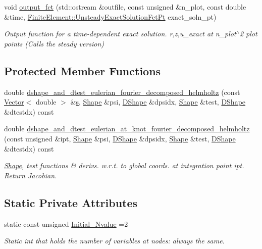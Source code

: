 \begin{DoxyCompactItemize}
void \hyperlink{classoomph_1_1QFourierDecomposedHelmholtzElement_a3552971f652e8b07888071fd8ada95cc}{output\+\_\+fct} (std\+::ostream \&outfile, const unsigned \&n\+\_\+plot, const double \&time, \hyperlink{classoomph_1_1FiniteElement_ad4ecf2b61b158a4b4d351a60d23c633e}{Finite\+Element\+::\+Unsteady\+Exact\+Solution\+Fct\+Pt} exact\+\_\+soln\+\_\+pt)
\begin{DoxyCompactList}\small\item\em Output function for a time-\/dependent exact solution. r,z,u\+\_\+exact at n\+\_\+plot$^\wedge$2 plot points (Calls the steady version) \end{DoxyCompactList}\end{DoxyCompactItemize}
\subsection*{Protected Member Functions}
\begin{DoxyCompactItemize}
\item 
double \hyperlink{classoomph_1_1QFourierDecomposedHelmholtzElement_aa1d0a5bb5a90ffa76df0bb054ffb00db}{dshape\+\_\+and\+\_\+dtest\+\_\+eulerian\+\_\+fourier\+\_\+decomposed\+\_\+helmholtz} (const \hyperlink{classoomph_1_1Vector}{Vector}$<$ double $>$ \&\hyperlink{cfortran_8h_ab7123126e4885ef647dd9c6e3807a21c}{s}, \hyperlink{classoomph_1_1Shape}{Shape} \&psi, \hyperlink{classoomph_1_1DShape}{D\+Shape} \&dpsidx, \hyperlink{classoomph_1_1Shape}{Shape} \&test, \hyperlink{classoomph_1_1DShape}{D\+Shape} \&dtestdx) const
\item 
double \hyperlink{classoomph_1_1QFourierDecomposedHelmholtzElement_a93414259c6dac210e2dc3064bf67c1e4}{dshape\+\_\+and\+\_\+dtest\+\_\+eulerian\+\_\+at\+\_\+knot\+\_\+fourier\+\_\+decomposed\+\_\+helmholtz} (const unsigned \&ipt, \hyperlink{classoomph_1_1Shape}{Shape} \&psi, \hyperlink{classoomph_1_1DShape}{D\+Shape} \&dpsidx, \hyperlink{classoomph_1_1Shape}{Shape} \&test, \hyperlink{classoomph_1_1DShape}{D\+Shape} \&dtestdx) const
\begin{DoxyCompactList}\small\item\em \hyperlink{classoomph_1_1Shape}{Shape}, test functions \& derivs. w.\+r.\+t. to global coords. at integration point ipt. Return Jacobian. \end{DoxyCompactList}\end{DoxyCompactItemize}
\subsection*{Static Private Attributes}
\begin{DoxyCompactItemize}
\item 
static const unsigned \hyperlink{classoomph_1_1QFourierDecomposedHelmholtzElement_a58d9cdd8eb3163b440a8c727f4d071e3}{Initial\+\_\+\+Nvalue} =2
\begin{DoxyCompactList}\small\item\em Static int that holds the number of variables at nodes\+: always the same. \end{DoxyCompactList}\end{DoxyCompactItemize}
